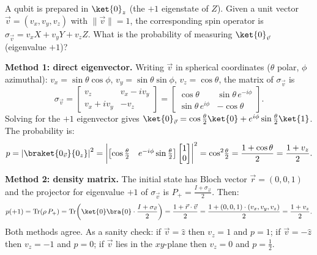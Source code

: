 \documentclass[oneside]{academica}
\begin{document}
\begin{exercise*}
  A qubit is prepared in $\ket{0}_z$ (the $+1$ eigenstate of $Z$).
  Given a unit vector $\vec{v}=(v_x,v_y,v_z)$ with $\|\vec{v}\|=1$,
  the corresponding spin operator is $\sigma_{\vec{v}}=v_x X+v_y Y+v_z Z$.
  What is the probability of measuring $\ket{0}_{\vec{v}}$ (eigenvalue $+1$)?

  \textbf{Method 1: direct eigenvector.}
  Writing $\vec{v}$ in spherical coordinates ($\theta$ polar, $\phi$ azimuthal):
  $v_x=\sin\theta\cos\phi$, $v_y=\sin\theta\sin\phi$, $v_z=\cos\theta$,
  the matrix of $\sigma_{\vec{v}}$ is
  \begin{equation*}
    \sigma_{\vec{v}} = \begin{bmatrix}v_z & v_x-iv_y \\ v_x+iv_y & -v_z\end{bmatrix}
    = \begin{bmatrix}\cos\theta & \sin\theta\,e^{-i\phi} \\ \sin\theta\,e^{i\phi} & -\cos\theta\end{bmatrix}.
  \end{equation*}
  Solving for the $+1$ eigenvector gives
  $\ket{0}_{\vec{v}} = \cos\tfrac{\theta}{2}\ket{0}+e^{i\phi}\sin\tfrac{\theta}{2}\ket{1}$.
  The probability is:
  \begin{equation*}
    p = \left|\braket{0_{\vec{v}}}{0_z}\right|^2
      = \left|\begin{bmatrix}\cos\tfrac{\theta}{2} & e^{-i\phi}\sin\tfrac{\theta}{2}\end{bmatrix}
              \begin{bmatrix}1\\0\end{bmatrix}\right|^2
      = \cos^2\!\tfrac{\theta}{2} = \frac{1+\cos\theta}{2} = \frac{1+v_z}{2}.
  \end{equation*}

  \textbf{Method 2: density matrix.}
  The initial state has Bloch vector $\vec{r}=(0,0,1)$ and
  the projector for eigenvalue $+1$ of $\sigma_{\vec{v}}$ is
  $P_+=\tfrac{I+\sigma_{\vec{v}}}{2}$.
Then:
  \begin{equation*}
    p(+1) = \tr(\rho\,P_+) = \tr\!\left(\ket{0}\bra{0}\cdot\frac{I+\sigma_{\vec{v}}}{2}\right)
    = \frac{1+\vec{r}\cdot\vec{v}}{2} = \frac{1+(0,0,1)\cdot(v_x,v_y,v_z)}{2} = \frac{1+v_z}{2}.
  \end{equation*}
  Both methods agree.
As a sanity check: if $\vec{v}=\hat{z}$ then $v_z=1$ and $p=1$;
  if $\vec{v}=-\hat{z}$ then $v_z=-1$ and $p=0$;
  if $\vec{v}$ lies in the $xy$-plane then $v_z=0$ and $p=\tfrac{1}{2}$.
\end{exercise*}
\end{document}
